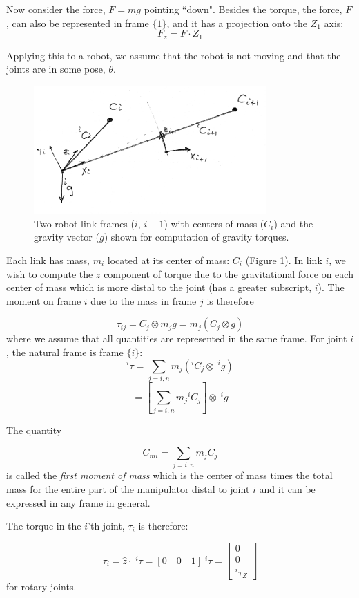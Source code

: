 Now consider the force, $F=mg$ pointing ``down".  Besides the torque, the force, $F$, can also be represented in frame $\{1\}$, and it has a projection onto the $Z_1$ axis:
\[
F_z = F \cdot Z_1
\]




Applying this to a robot, we assume that the robot is not moving and that the joints are in some pose, $\theta$.

\begin{figure}\centering
   \includegraphics[width=3.5in]{figs06/00856.eps}
\caption{Two robot link frames ($i$, $i+1$) with centers of mass ($C_i$) and the gravity vector ($g$) shown for computation of gravity torques.}\label{linkcomstorque}
\end{figure}

Each link has mass, $m_i$ located at its center of mass: $C_i$ (Figure \ref{linkcomstorque}).
In link $i$, we wish to compute the $z$ component of torque due to the gravitational force on each center of mass which is more distal to the joint (has a greater subscript, $i$).
The moment on frame $i$ due to the mass in frame $j$ is therefore

\[
\tau_{ij} = C_j\otimes m_j g =  m_j ( C_j \otimes g)
\]
where we assume that all quantities are represented in the same frame.   For joint $i$, the natural frame is frame $\{i\}$:
\[
^i\tau = \sum_{j=i,n} m_j ({^iC_j} \otimes\; {^ig})
\]
\[
= \left [ \sum_{j=i,n} m_j {^iC_j} \right ] \otimes\;  {^ig}
\]

The quantity

\[
{C_{mi}} =  \sum_{j=i,n} m_j {C_j}
\]
is called the {\it first moment of mass} which is the center of mass times the total mass for the entire part of the manipulator distal to joint $i$ and it can be expressed in any frame in general.


The torque in the $i$'th joint, $\tau_i$ is therefore:

\[
\tau_i =  \hat{z}\cdot \;{^i\tau} = [0 \quad 0 \quad 1] \;{^i\tau} = \begin{bmatrix}0\\0\\{^i\tau_Z}\end{bmatrix}
\]
for rotary joints.



